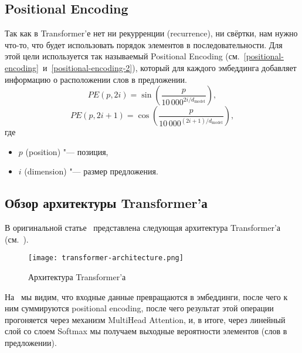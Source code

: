 \subsection{Positional Encoding}


Так как в Transformer'е нет ни рекурренции (recurrence), ни свёртки, нам нужно что-то, что будет использовать порядок элементов в последовательности.
Для этой цели используется так называемый Positional Encoding (см.~\eqref{positional-encoding}~и~\eqref{positional-encoding-2}), который для каждого эмбеддинга добавляет информацию о расположении слов в предложении.
\begin{equation}\label{positional-encoding}%
  PE(p, 2i) = \sin\left( \frac{p}{10\,000^{2i / d_{\text{model}}}} \right),
\end{equation}
\begin{equation}\label{positional-encoding-2}%
  PE(p, 2i + 1) = \cos\left( \frac{p}{10\,000^{(2i + 1) / d_{\text{model}}}} \right),
\end{equation}
где
\begin{itemize}%
  \item $p$ (position) "--- позиция,
  \item $i$ (dimension) "--- размер предложения.
\end{itemize}


\subsection{Обзор архитектуры Transformer'а}


В оригинальной статье~\cite{Transformer2019} представлена следующая архитектура Transformer'а (см.~).
\begin{figure}[H]%
  \centering
  \texttt{[image: transformer-architecture.png]}
  \caption{Архитектура Transformer'а}
  \label{transformer-architecture}
\end{figure}

На~ мы видим, что входные данные превращаются в эмбеддинги, после чего к ним суммируются positional encoding, после чего результат этой операции прогоняется через механизм MultiHead Attention, и, в итоге, через линейный слой со слоем Softmax мы получаем выходные вероятности элементов (слов в предложении).



